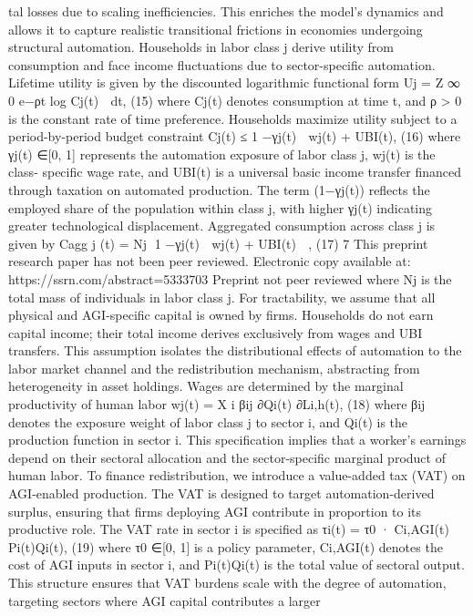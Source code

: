 tal losses due to scaling inefficiencies. This enriches the model’s dynamics and allows it to
capture realistic transitional frictions in economies undergoing structural automation.
Households in labor class j derive utility from consumption and face income fluctuations
due to sector-specific automation. Lifetime utility is given by the discounted logarithmic
functional form
Uj =
Z ∞
0
e−ρt log
 Cj(t)

dt,
(15)
where Cj(t) denotes consumption at time t, and ρ > 0 is the constant rate of time preference.
Households maximize utility subject to a period-by-period budget constraint
Cj(t) ≤
 1 −γj(t)

wj(t) + UBI(t),
(16)
where γj(t) ∈[0, 1] represents the automation exposure of labor class j, wj(t) is the class-
specific wage rate, and UBI(t) is a universal basic income transfer financed through taxation
on automated production. The term (1−γj(t)) reflects the employed share of the population
within class j, with higher γj(t) indicating greater technological displacement. Aggregated
consumption across class j is given by
Cagg
j
(t) = Nj
 1 −γj(t)

wj(t) + UBI(t)

,
(17)
7
This preprint research paper has not been peer reviewed. Electronic copy available at: https://ssrn.com/abstract=5333703
Preprint not peer reviewed
where Nj is the total mass of individuals in labor class j. For tractability, we assume that all
physical and AGI-specific capital is owned by firms. Households do not earn capital income;
their total income derives exclusively from wages and UBI transfers. This assumption isolates
the distributional effects of automation to the labor market channel and the redistribution
mechanism, abstracting from heterogeneity in asset holdings. Wages are determined by the
marginal productivity of human labor
wj(t) =
X
i
βij
∂Qi(t)
∂Li,h(t),
(18)
where βij denotes the exposure weight of labor class j to sector i, and Qi(t) is the production
function in sector i. This specification implies that a worker’s earnings depend on their
sectoral allocation and the sector-specific marginal product of human labor.
To finance
redistribution, we introduce a value-added tax (VAT) on AGI-enabled production.
The
VAT is designed to target automation-derived surplus, ensuring that firms deploying AGI
contribute in proportion to its productive role. The VAT rate in sector i is specified as
τi(t) = τ0 · Ci,AGI(t)
Pi(t)Qi(t),
(19)
where τ0 ∈[0, 1] is a policy parameter, Ci,AGI(t) denotes the cost of AGI inputs in sector i,
and Pi(t)Qi(t) is the total value of sectoral output. This structure ensures that VAT burdens
scale with the degree of automation, targeting sectors where AGI capital contributes a larger

